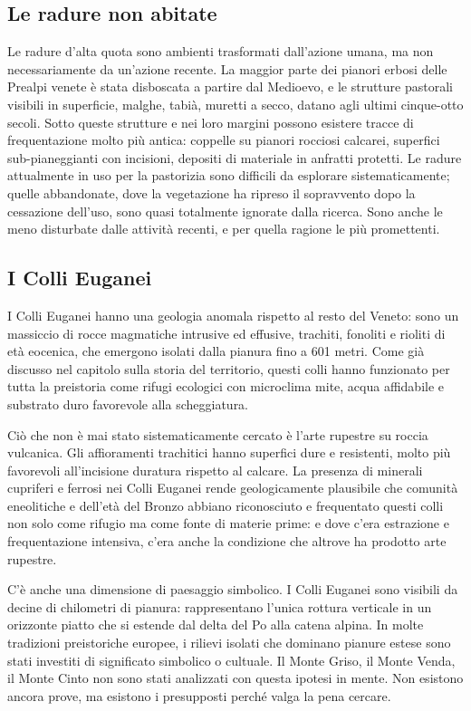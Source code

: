 \subsection*{Le radure non abitate}

Le radure d'alta quota sono ambienti trasformati dall'azione umana, ma non necessariamente da un'azione recente. La maggior parte dei pianori erbosi delle Prealpi venete è stata disboscata a partire dal Medioevo, e le strutture pastorali visibili in superficie, malghe, tabià, muretti a secco, datano agli ultimi cinque-otto secoli. Sotto queste strutture e nei loro margini possono esistere tracce di frequentazione molto più antica: coppelle su pianori rocciosi calcarei, superfici sub-pianeggianti con incisioni, depositi di materiale in anfratti protetti. Le radure attualmente in uso per la pastorizia sono difficili da esplorare sistematicamente; quelle abbandonate, dove la vegetazione ha ripreso il sopravvento dopo la cessazione dell'uso, sono quasi totalmente ignorate dalla ricerca. Sono anche le meno disturbate dalle attività recenti, e per quella ragione le più promettenti.

\subsection*{I Colli Euganei}

I Colli Euganei hanno una geologia anomala rispetto al resto del Veneto: sono un massiccio di rocce magmatiche intrusive ed effusive, trachiti, fonoliti e rioliti di età eocenica, che emergono isolati dalla pianura fino a 601 metri. Come già discusso nel capitolo sulla storia del territorio, questi colli hanno funzionato per tutta la preistoria come rifugi ecologici con microclima mite, acqua affidabile e substrato duro favorevole alla scheggiatura.

Ciò che non è mai stato sistematicamente cercato è l'arte rupestre su roccia vulcanica. Gli affioramenti trachitici hanno superfici dure e resistenti, molto più favorevoli all'incisione duratura rispetto al calcare. La presenza di minerali cupriferi e ferrosi nei Colli Euganei rende geologicamente plausibile che comunità eneolitiche e dell'età del Bronzo abbiano riconosciuto e frequentato questi colli non solo come rifugio ma come fonte di materie prime: e dove c'era estrazione e frequentazione intensiva, c'era anche la condizione che altrove ha prodotto arte rupestre.

C'è anche una dimensione di paesaggio simbolico. I Colli Euganei sono visibili da decine di chilometri di pianura: rappresentano l'unica rottura verticale in un orizzonte piatto che si estende dal delta del Po alla catena alpina. In molte tradizioni preistoriche europee, i rilievi isolati che dominano pianure estese sono stati investiti di significato simbolico o cultuale. Il Monte Griso, il Monte Venda, il Monte Cinto non sono stati analizzati con questa ipotesi in mente. Non esistono ancora prove, ma esistono i presupposti perché valga la pena cercare.

